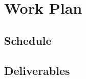 \documentclass{mprop}
\begin{document}
\par

\section{Work Plan}

\par

\subsection{Schedule}

\subsection{Deliverables}

\par 



\end{document}

